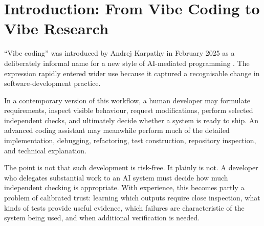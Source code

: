 \begin{abstract}
We then consider why comparable practices have been absorbed much more readily into software engineering than into academic publishing. One important difference is institutional. Software-development methodology can change directly through practice: a team which finds a new agentic workflow useful can often begin using it immediately. Academic publishing is governed by formal authorship and ethics policies which change through slower institutional processes. We examine the ACL Policy on Publication Ethics as a particularly relevant example. Its framework for generative assistance, introduced in 2024 and still substantially retained in the current policy, is difficult to map cleanly onto sustained project-scale agentic collaboration.

Our purpose is not to argue that vibe research is risk-free, nor to propose a general rule for AI authorship. We instead identify an asymmetry between software engineering and academic research, examine some of its conceptual, technical, and institutional foundations, and ask whether current academic conventions accurately describe emerging forms of human--AI research collaboration.
\end{abstract}


\section{Introduction: From Vibe Coding to Vibe Research}

``Vibe coding'' was introduced by Andrej Karpathy in February 2025 as a deliberately informal name for a new style of AI-mediated programming \citep{fowler2026vibecoding}. The expression rapidly entered wider use because it captured a recognisable change in software-development practice.

In a contemporary version of this workflow, a human developer may formulate requirements, inspect visible behaviour, request modifications, perform selected independent checks, and ultimately decide whether a system is ready to ship. An advanced coding assistant may meanwhile perform much of the detailed implementation, debugging, refactoring, test construction, repository inspection, and technical explanation.

The point is not that such development is risk-free. It plainly is not. A developer who delegates substantial work to an AI system must decide how much independent checking is appropriate. With experience, this becomes partly a problem of calibrated trust: learning which outputs require close inspection, what kinds of tests provide useful evidence, which failures are characteristic of the system being used, and when additional verification is needed.

